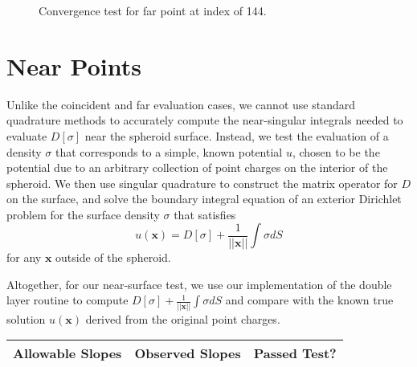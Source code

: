 \documentclass[12pt]{article}
\begin{document}
\begin{figure}[!ht]
    \centering
    \caption{Convergence test for far point at index \protect of 144.}
\end{figure}

\pagebreak

\section*{Near Points}
Unlike the coincident and far evaluation cases, we cannot use standard quadrature methods to accurately compute the near-singular integrals needed to evaluate $D[\sigma]$ near the spheroid surface.
Instead, we test the evaluation of a density $\sigma$ that corresponds to a simple, known potential $u$, chosen to be the potential due to an arbitrary collection of point charges on the interior of the spheroid.
We then use singular quadrature to construct the matrix operator for $D$ on the surface, and solve the boundary integral equation of an exterior Dirichlet problem for the surface density $\sigma$ that satisfies
$$u(\mathbf{x}) = D[\sigma] + \frac{1}{||\mathbf{x}||}\int \sigma d S$$
for any $\mathbf{x}$ outside of the spheroid. 

Altogether, for our near-surface test, we use our implementation of the double layer routine to compute $D[\sigma]+\frac{1}{||\mathbf{x}||}\int \sigma d S$ and compare with the known true solution $u(\mathbf{x})$ derived from the original point charges.

\begin{center}
\def\arraystretch{1.5}
\begin{tabular}{|c|c|c|} \hline
    Allowable Slopes & Observed Slopes & Passed Test?\\ \hline
    
\end{tabular}
\end{center}
\end{document}
